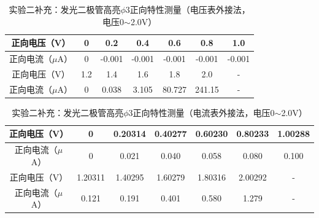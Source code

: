 \documentclass[a4paper]{article}
\begin{document}
    \begin{table}[!ht]
        \caption{实验二补充：发光二极管高亮$\phi3$正向特性测量（电压表外接法，电压0$\sim$2.0V）}\label{tab:exp4}
        \begin{tabularx}{\textwidth}{c*{6}{C}} \toprule
            正向电压（V） & 0 & 0.2 & 0.4 & 0.6 & 0.8 & 1.0 \\ \midrule
            正向电流（$\mu$A） & 0 & -0.001 & -0.001 & -0.001 & -0.001 & -0.001 \\ \midrule
            正向电压（V） & 1.2 & 1.4 & 1.6 & 1.8 & 2.0 & - \\ \midrule
            正向电流（$\mu$A） & 0 & 0.038 & 3.105 & 80.727 & 241.15 & - \\ 
        \bottomrule
        \end{tabularx}
    \end{table}
    \begin{table}[!ht]
        \caption{实验二补充：发光二极管高亮$\phi3$正向特性测量（电流表外接法，电压0$\sim$2.0V）}\label{tab:exp4}
        \begin{tabularx}{\textwidth}{c*{6}{C}} \toprule
            正向电压（V） & 0 & 0.20314 & 0.40277 & 0.60230 & 0.80233 & 1.00288 \\ \midrule
            正向电流（$\mu$A） & 0 & 0.021 & 0.040 & 0.058 & 0.080 & 0.100 \\ \midrule
            正向电压（V）  & 1.20311 & 1.40295 & 1.60279 & 1.80316 & 2.00292 & - \\ \midrule
            正向电流（$\mu$A） & 0.121 & 0.191 & 0.401 & 0.580 & 1.279 & - \\ 
        \bottomrule
        \end{tabularx}
    \end{table}

\clearpage
\end{document}
